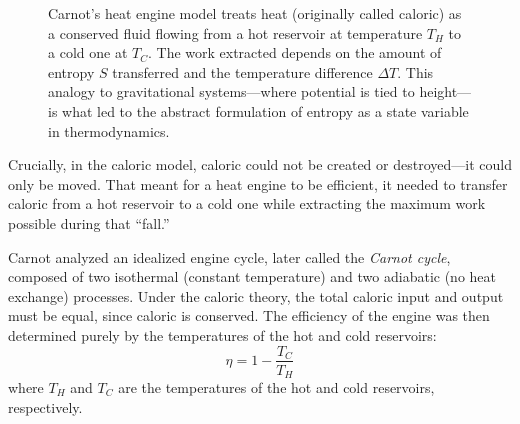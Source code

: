 \begin{figure}[H]
\centering
{}
\caption{
Carnot’s heat engine model treats heat (originally called caloric) as a conserved fluid flowing from a hot reservoir at temperature \( T_H \) to a cold one at \( T_C \). The work extracted depends on the amount of entropy \( S \) transferred and the temperature difference \( \Delta T \). This analogy to gravitational systems—where potential is tied to height—is what led to the abstract formulation of entropy as a state variable in thermodynamics.
}
\end{figure}



Crucially, in the caloric model, caloric could not be created or destroyed—it could only be moved. That meant for a heat engine to be efficient, it needed to transfer caloric from a hot reservoir to a cold one while extracting the maximum work possible during that “fall.”

Carnot analyzed an idealized engine cycle, later called the \emph{Carnot cycle}, composed of two isothermal (constant temperature) and two adiabatic (no heat exchange) processes. Under the caloric theory, the total caloric input and output must be equal, since caloric is conserved. The efficiency of the engine was then determined purely by the temperatures of the hot and cold reservoirs:
\[
\eta = 1 - \frac{T_C}{T_H}
\]
where \( T_H \) and \( T_C \) are the temperatures of the hot and cold reservoirs, respectively.

